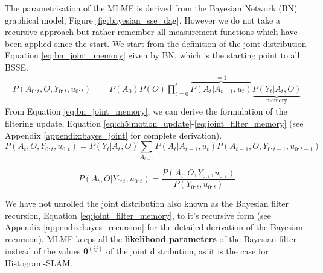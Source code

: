 The parametrisation of the MLMF is derived from the Bayesian Network (BN) graphical model, Figure \ref{fig:bayesian_sse_dag}. However
we do not take a recursive approach but rather remember all measurement functions which have been applied since 
the start. We start from the definition of the joint distribution Equation \ref{eq:bn_joint_memory} given by BN, which is the starting point to all BSSE.
\begin{align}
 P(A_{0:t},O,Y_{0:t},u_{0:t}) &= P(A_0)P(O)\prod_{t=0}^{t} \overbrace{P(A_t|A_{t-1},u_{t})}^{=1}  \underbrace{ P(Y_t|A_t,O) }_{\mathrm{memory}} \label{eq:bn_joint_memory} %
\end{align}
From Equation \ref{eq:bn_joint_memory}, we can derive the formulation of the filtering update, Equation \ref{eq:ch5:motion_update}-\ref{eq:joint_filter_memory}
(see Appendix \ref{appendix:bayes_joint} for complete derivation).
\begin{equation}
 P(A_t,O,Y_{0:t},u_{0:t}) =  P(Y_t|A_{t},O)  \sum_{A_{t-1}} P(A_t|A_{t-1},u_t)  P(A_{t-1},O,Y_{0:t-1},u_{0:t-1})  \label{eq:ch5:motion_update}
\end{equation}

\begin{equation}
  P(A_t,O|Y_{0:t},u_{0:t}) = \frac{P(A_t,O,Y_{0:t},u_{0:t}) }{P(Y_{0:t},u_{0:t}) } \label{eq:joint_filter_memory}
\end{equation}


We have not unrolled the joint distribution also known as the Bayesian filter recursion, Equation \ref{eq:joint_filter_memory}, to it's recursive form  (see Appendix \ref{appendix:bayes_recursion} for the detailed derivation
of the Bayesian recursion). MLMF keeps all the \textbf{likelihood parameters} of the Bayesian filter
instead of the values $\boldsymbol{\theta}^{(ij)}$ of the joint distribution, as it is the case for Histogram-SLAM.

